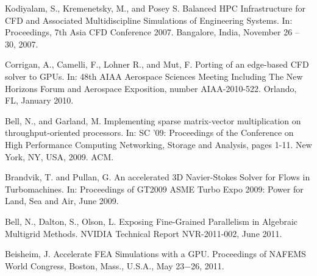 
\begin{thebibliography}{10}

{\sc Kodiyalam, S., Kremenetsky, M., and Posey S.} Balanced HPC Infrastructure for CFD and Associated Multidiscipline Simulations of Engineering Systems. In: Proceedings, 7th Asia CFD Conference 2007. Bangalore, India, November 26 – 30, 2007.


{\sc Corrigan, A., Camelli, F., Lohner R., and Mut, F.} Porting of an edge-based CFD solver to GPUs. In: 48th AIAA Aerospace Sciences Meeting Including The New Horizons Forum and Aerospace Exposition, number AIAA-2010-522. Orlando, FL, January 2010.


{\sc Bell, N., and Garland, M.} Implementing sparse matrix-vector multiplication on throughput-oriented processors. In: SC '09: Proceedings of the Conference on High Performance Computing Networking, Storage and Analysis, pages 1-11. New York, NY, USA, 2009. ACM.

{\sc Brandvik, T. and Pullan, G.} An accelerated 3D Navier-Stokes Solver for Flows in Turbomachines. In: Proceedings of GT2009 ASME Turbo Expo 2009: Power for Land, Sea and Air, June 2009.

{\sc Bell, N., Dalton, S., Olson, L.} Exposing Fine-Grained Parallelism in Algebraic Multigrid Methods. NVIDIA Technical Report NVR-2011-002, June 2011.

{\sc Beisheim, J.} Accelerate FEA Simulations with a GPU. Proceedings of NAFEMS 
World Congress, Boston, Mass., U.S.A., May 23−26, 2011.


\end{thebibliography}
